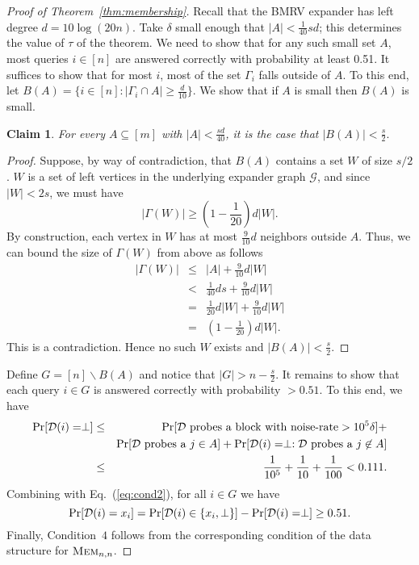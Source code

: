 \documentclass[11pt,english]{article}
\newtheorem{claim}[theorem]{Claim}
\theoremstyle{definition}
\theoremstyle{remark}
\newcommand{\D}{{\cal D}}
\newcommand{\mem}{\mbox{\textsc{Mem}}}
\begin{document}
\begin{proof}[Proof of Theorem~\ref{thm:membership}]
Recall that the BMRV expander has left degree $d=10\log(20n)$. Take
$\delta$ small enough that $|A|<\frac{1}{40}sd$; this determines
the value of $\tau$ of the theorem. We need to show that for any
such small set $A$, most queries $i\in[n]$ are answered correctly
with probability at least 0.51. It suffices to show that for most
$i$, most of the set $\Gamma_{i}$ falls outside of $A$. To this
end, let $B(A)=\{i\in[n]:|\Gamma_{i}\cap A|\geq\frac{d}{10}\}$. We
show that if $A$ is small then $B(A)$ is small.

\begin{claim} For every $A\subseteq[m]$ with $|A|<\frac{sd}{40}$,
it is the case that $|B(A)|<\frac{s}{2}.$ \end{claim}

\begin{proof} Suppose, by way of contradiction, that $B(A)$ contains
a set $W$ of size $s/2$. $W$ is a set of left vertices in the underlying
expander graph $\mathcal{G}$, and since $|W|<2s$, we must have \[
|\Gamma(W)|\geq\left(1-\frac{1}{20}\right)d|W|.\]
 By construction, each vertex in $W$ has at most $\frac{9}{10}d$
neighbors outside $A$. Thus, we can bound the size of $\Gamma(W)$
from above as follows\begin{eqnarray*}
|\Gamma(W)| & \leq & |A|+\frac{9}{10}d|W|\\
 & < & \frac{1}{40}ds+\frac{9}{10}d|W|\\
 & = & \frac{1}{20}d|W|+\frac{9}{10}d|W|\\
 & = & \left(1-\frac{1}{20}\right)d|W|.\end{eqnarray*}
 This is a contradiction. Hence no such $W$ exists and $|B(A)|<\frac{s}{2}$.
\end{proof}

Define $G=[n]\backslash B(A)$ and notice that $|G|>n-\frac{s}{2}$.
It remains to show that each query $i\in G$ is answered correctly
with probability $>0.51$. To this end, we have \begin{eqnarray*}
\Pr[\D(i)=\perp] & \leq & \Pr[\D\mbox{ probes a block with noise-rate}>10^{5}\delta]+\\
 &  & \Pr[\D\mbox{ probes a }j\in A]+\Pr[\D(i)=\perp:\D\mbox{ probes a }j\not\in A]\\
 & \leq & \frac{1}{10^{5}}+\frac{1}{10}+\frac{1}{100}<0.111.\end{eqnarray*}
 Combining with Eq.~(\ref{eq:cond2}), for all $i\in G$ we have
\[
\Pr[\D(i)=x_{i}]=\Pr[\D(i)\in\{x_{i},\perp\}]-\Pr[\D(i)=\perp]\geq0.51.\]
 Finally, Condition~$4$ follows from the corresponding condition
of the data structure for $\mem_{n,n}$. \end{proof}
\end{document}
